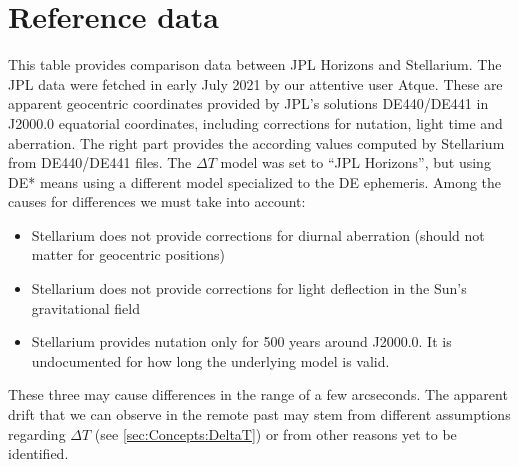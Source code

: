 \section{Reference data}
\label{sec:Accuracy:JPLcomparison}

This table provides comparison data between JPL Horizons and
Stellarium. The JPL data were fetched in early July 2021 by our
attentive user Atque. These are apparent geocentric coordinates
provided by JPL's solutions DE440/DE441 in J2000.0 equatorial
coordinates, including corrections for nutation, light time and
aberration. The right part provides the according values computed by
Stellarium from DE440/DE441 files. The $\Delta T$ model was set to
``JPL Horizons'', but using DE* means using a different model
specialized to the DE ephemeris.  Among the causes for differences we
must take into account:
\begin{itemize}
\item Stellarium does not provide corrections for diurnal aberration (should not matter for geocentric positions)
\item Stellarium does not provide corrections for light deflection in the Sun's gravitational field
\item Stellarium provides nutation only for 500 years around
  J2000.0. It is undocumented for how long the underlying model is
  valid.
\end{itemize}
These three may cause differences in the range of a few
arcseconds. The apparent drift that we can observe in the remote past
may stem from different assumptions regarding $\Delta T$ (see
\ref{sec:Concepts:DeltaT}) or from other reasons yet to be identified. 


\scriptsize

\normalsize





